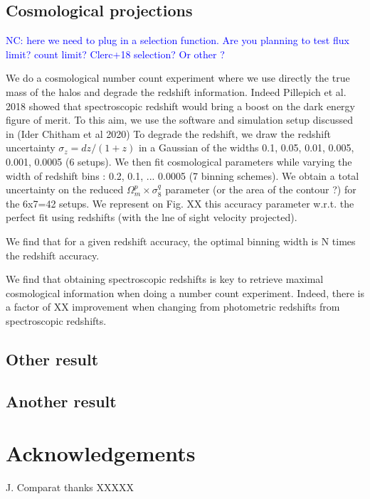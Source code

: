 \documentclass[fleqn,usenatbib,onecolumn]{mnras}
\begin{document}
\subsection{Cosmological projections}

\textcolor{blue}{NC: here we need to plug in a selection function. Are you planning to test flux limit? count limit? Clerc+18 selection? Or other ?}

We do a cosmological number count experiment where we use directly the true mass of the halos and degrade the redshift information. 
Indeed Pillepich et al. 2018 showed that spectroscopic redshift would bring a boost on the dark energy figure of merit. 
To this aim, we use the software and simulation setup discussed in (Ider Chitham et al 2020)
To degrade the redshift, we draw the redshift uncertainty $\sigma_z = dz/(1+z)$ in a Gaussian of the widths 0.1, 0.05, 0.01, 0.005, 0.001, 0.0005 (6 setups). 
We then fit cosmological parameters while varying the width of redshift bins : 0.2, 0.1, ... 0.0005 (7 binning schemes). 
We obtain a total uncertainty on the reduced $\Omega_m^p \times \sigma_8^q$ parameter (or the area of the contour ?) for the 6x7=42 setups. 
We represent on Fig. XX %
this accuracy parameter w.r.t. the perfect fit using redshifts (with the lne of sight velocity projected).

We find that for a given redshift accuracy, the optimal binning width is N times the redshift accuracy. 

We find that obtaining spectroscopic redshifts is key to retrieve maximal cosmological information when doing a number count experiment. 
Indeed, there is a factor of XX improvement when changing from photometric redshifts from spectroscopic redshifts. 

\subsection{Other result}

\subsection{Another result}

\section*{Acknowledgements}
J. Comparat thanks XXXXX
\end{document}
